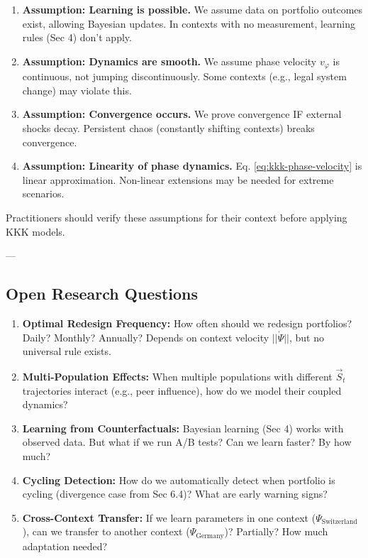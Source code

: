 \begin{enumerate}

\item \textbf{Assumption: Learning is possible.} We assume data on portfolio outcomes exist, allowing Bayesian updates. In contexts with no measurement, learning rules (Sec 4) don't apply.

\item \textbf{Assumption: Dynamics are smooth.} We assume phase velocity $v_\varphi$ is continuous, not jumping discontinuously. Some contexts (e.g., legal system change) may violate this.

\item \textbf{Assumption: Convergence occurs.} We prove convergence IF external shocks decay. Persistent chaos (constantly shifting contexts) breaks convergence.

\item \textbf{Assumption: Linearity of phase dynamics.} Eq. \ref{eq:kkk-phase-velocity} is linear approximation. Non-linear extensions may be needed for extreme scenarios.

\end{enumerate}

Practitioners should verify these assumptions for their context before applying KKK models.

---


\subsection*{Open Research Questions}

\begin{enumerate}

\item \textbf{Optimal Redesign Frequency:} How often should we redesign portfolios? Daily? Monthly? Annually? Depends on context velocity $||\dot{\Psi}||$, but no universal rule exists.

\item \textbf{Multi-Population Effects:} When multiple populations with different $\vec{S}_t$ trajectories interact (e.g., peer influence), how do we model their coupled dynamics?

\item \textbf{Learning from Counterfactuals:} Bayesian learning (Sec 4) works with observed data. But what if we run A/B tests? Can we learn faster? By how much?

\item \textbf{Cycling Detection:} How do we automatically detect when portfolio is cycling (divergence case from Sec 6.4)? What are early warning signs?

\item \textbf{Cross-Context Transfer:} If we learn parameters in one context ($\Psi_{\text{Switzerland}}$), can we transfer to another context ($\Psi_{\text{Germany}}$)? Partially? How much adaptation needed?

\end{enumerate}

